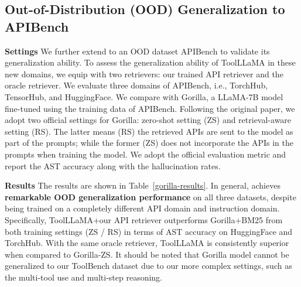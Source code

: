 \subsection{Out-of-Distribution (OOD) Generalization to APIBench~\citep{patil2023gorilla}}
\label{sec:ood_exp}

\textbf{Settings} \quad
We further extend \ourmodel to an OOD dataset APIBench to validate its generalization ability. To assess the generalization ability of ToolLLaMA in these new domains, we equip \ourmodel with two retrievers: our trained API retriever and the oracle retriever. We evaluate three domains of APIBench, i.e., TorchHub, TensorHub, and HuggingFace. We compare \ourmodel with Gorilla, a LLaMA-7B model fine-tuned using the training data of APIBench. Following the original paper, we adopt two official settings for Gorilla: zero-shot setting (ZS) and retrieval-aware setting (RS). The latter means (RS) the retrieved APIs are sent to the model as part of the prompts; while the former (ZS) does not incorporate the APIs in the prompts when training the model. We adopt the official evaluation metric and report the AST accuracy along with the hallucination rates.

\textbf{Results} \quad
The results are shown in Table~\ref{gorilla-results}. In general, \ourmodel achieves \textbf{remarkable OOD generalization performance} on all three datasets, despite being trained on a completely different API domain and instruction domain. Specifically, ToolLLaMA+our API retriever outperforms Gorilla+BM25 from both training settings (ZS / RS) in terms of AST accuracy on HuggingFace and TorchHub. With the same oracle retriever, ToolLLaMA is consistently superior when compared to Gorilla-ZS. It should be noted that Gorilla model cannot be generalized to our ToolBench dataset due to our more complex settings, such as the multi-tool use and multi-step reasoning.



